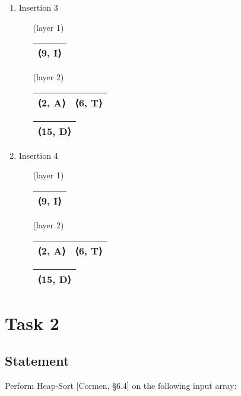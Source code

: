 \documentclass{article}
\begin{document}
\begin{enumerate}
    \item Insertion 3
    \begin{enumerate}
        \item [(layer 1)]
            \begin{tabular}{|c|}
                \hline
                 ⟨9, I⟩ \\
                 \hline
            \end{tabular} \;
        \item [(layer 2)]
            \begin{tabular}{|c|c|}
                \hline
                 ⟨2, A⟩ & ⟨6, T⟩ \\
                \hline
            \end{tabular} \;
            \begin{tabular}{|c|}
                \hline
                 ⟨15, D⟩ \\
                \hline
            \end{tabular} \;
    \end{enumerate}
    
    \item Insertion 4
    \begin{enumerate}
        \item [(layer 1)]
            \begin{tabular}{|c|}
                \hline
                 ⟨9, I⟩ \\
                 \hline
            \end{tabular} \;
        \item [(layer 2)]
            \begin{tabular}{|c|c|}
                \hline
                 ⟨2, A⟩ & ⟨6, T⟩ \\
                \hline
            \end{tabular} \;
            \begin{tabular}{|c|}
                \hline
                 ⟨15, D⟩ \\
                \hline
            \end{tabular} \;
    \end{enumerate}
\end{enumerate}
\setlength{\tabcolsep}{6pt}


\section{Task 2}
\subsection{Statement}
Perform Heap-Sort [Cormen, §6.4] on the following input array:
\end{document}
